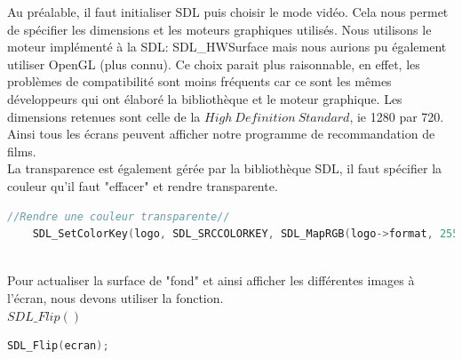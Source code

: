 \documentclass[light]{ceri}
\begin{document}
\indent Au préalable, il faut initialiser SDL puis choisir le mode vidéo. Cela nous permet de spécifier les dimensions et les moteurs graphiques utilisés. Nous utilisons le moteur implémenté à la SDL: SDL\_HWSurface mais nous aurions pu également utiliser OpenGL (plus connu). Ce choix parait plus raisonnable, en effet, les problèmes de compatibilité sont moins fréquents car ce sont les mêmes développeurs qui ont élaboré la bibliothèque et le moteur graphique. Les dimensions retenues sont celle de la \begin{math}High\ Definition\ Standard\end{math}, ie 1280 par 720. Ainsi tous les écrans peuvent afficher notre programme de recommandation de films.\\
\indent La transparence est également gérée par la bibliothèque SDL, il faut spécifier la couleur qu'il faut "effacer" et rendre transparente.
    \begin{lstlisting}[language=c]
    //Rendre une couleur transparente//
    SDL_SetColorKey(logo, SDL_SRCCOLORKEY, SDL_MapRGB(logo->format, 255,255,255));
    \end{lstlisting}\\
\indent Pour actualiser la surface de "fond" et ainsi afficher les différentes images à l'écran, nous devons utiliser la fonction.\\ \begin{math}SDL\_Flip()\end{math}
    \begin{lstlisting}[language=c]
    SDL_Flip(ecran);
    \end{lstlisting}\\    
\end{document}

